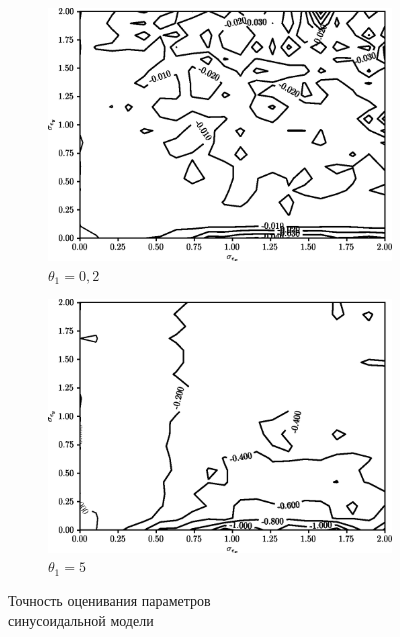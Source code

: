 \begin{figure}[b]
  \begin{subfigure}[b]{\linewidth}
    \centering
    \includegraphics[width=135mm]{fig/nonlinear/sinusoidal/alpha-0_beta-0,2.png}
    \caption{\( \theta_1 = 0,2 \)}
  \end{subfigure}

  \vspace{2\baselineskip}
  \begin{subfigure}[b]{\linewidth}
  \centering
  \includegraphics[width=135mm]{fig/nonlinear/sinusoidal/alpha-0_beta-5.png}
  \caption{\( \theta_1 = 5 \)}
\end{subfigure}

\vspace{\baselineskip}
  \caption{
    Точность оценивания параметров \\
    синусоидальной модели
  }\label{fig:comparison_nonlinear_sinusoidal}
\end{figure}
